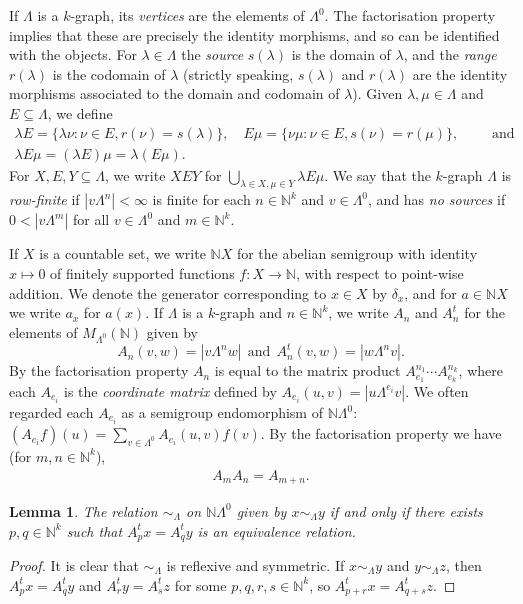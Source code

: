 \documentclass[a4paper, 12pt]{amsart}
\numberwithin{equation}{section}
\newcounter{theorem}
\newtheorem{lemma}[theorem]{Lemma}
\theoremstyle{remark}
\theoremstyle{definition}
\begin{document}
If $\Lambda$ is a $k$-graph, its \emph{vertices} are the elements of $\Lambda^0$. The
factorisation property implies that these are precisely the identity morphisms, and so
can be identified with the objects. For $\lambda \in \Lambda$ the \emph{source}
$s(\lambda)$ is the domain of $\lambda$, and the \emph{range} $r(\lambda)$ is the
codomain of $\lambda$ (strictly speaking, $s(\lambda)$ and $r(\lambda)$ are the identity
morphisms associated to the domain and codomain of $\lambda$). Given $\lambda,\mu\in
\Lambda$ and $E\subseteq \Lambda$, we define
\begin{gather*}
\lambda E=\{\lambda\nu : \nu\in E, r(\nu)=s(\lambda)\},\quad E\mu=\{\nu\mu : \nu\in E, s(\nu)=r(\mu)\},\qquad\text{ and}\\
\lambda E\mu=(\lambda E)\mu=\lambda(E\mu).
\end{gather*}
For $X,E,Y\subseteq\Lambda$, we write $XEY$ for $\bigcup_{\lambda\in X, \mu\in Y}\lambda
E\mu$. We say that the $k$-graph $\Lambda$ is \textit{row-finite} if $|v{\Lambda}^{n}|<\infty$
is finite for each $n\in\mathbb{N}^k$ and $v\in{\Lambda}^0$, and has \textit{no sources}
if $0<|v{\Lambda}^{m}|$ for all $v\in{\Lambda}^0$ and $m\in\mathbb{N}^k$.

If $X$ is a countable set, we write ${\mathbb{N}} X$ for the abelian semigroup with identity
$x\mapsto 0$ of finitely supported functions $f\colon X\to {\mathbb{N}}$, with respect to
point-wise addition.  We denote the generator corresponding to $x\in X$ by $\delta_x$,
and for $a\in  {\mathbb{N}} X$ we write $a_x$ for $a(x)$. If $\Lambda$ is a $k$-graph and $n\in
{\mathbb{N}}^k$, we write $A_n$ and $A_n^t$ for the elements of $M_{\Lambda^0}({\mathbb{N}})$ given by
$$A_n(v, w) = |v\Lambda^n w| \ \ \textrm{and} \ \ A_n^t(v, w) = |w\Lambda^n v|.$$
By the factorisation property $A_n$ is equal to the matrix product $A_{e_1}^{n_1}\cdots A_{e_k}^{n_k}$, where each $A_{e_i}$ is
the \emph{coordinate matrix} defined by $A_{e_i}(u, v) =  |u\Lambda^{e_i} v|$. We often regarded each $A_{e_i}$ as
a semigroup endomorphism of ${\mathbb{N}}\Lambda^0$: $(A_{e_i}f)(u) =\sum_{v\in \Lambda^0} A_{e_i}(u,
v)f(v)$. By the
factorisation property we have (for $m,n\in {\mathbb{N}}^k$),
\begin{eqnarray}\label{factorisation}
A_mA_n = A_{m+n}.
\end{eqnarray}

\begin{lemma}\label{lem.relation.one}
The relation $\sim_{\Lambda}$ on ${\mathbb{N}}\Lambda^0$ given by $x\sim_{\Lambda} y$ if and only
if there exists $p,q\in {\mathbb{N}}^k$ such that $A^t_px=A^t_qy$ is an equivalence relation.
\end{lemma}
\begin{proof}
It is clear that $\sim_{\Lambda}$ is reflexive and symmetric. If $x\sim_{\Lambda}y$ and
$y\sim_{\Lambda}z$, then $A^t_px=A^t_qy$ and $A^t_ry=A^t_sz$ for some $p,q,r,s\in {\mathbb{N}}^k$,
so $A^t_{p+r}x=A^t_{q+s}z$.
\end{proof}
\end{document}
